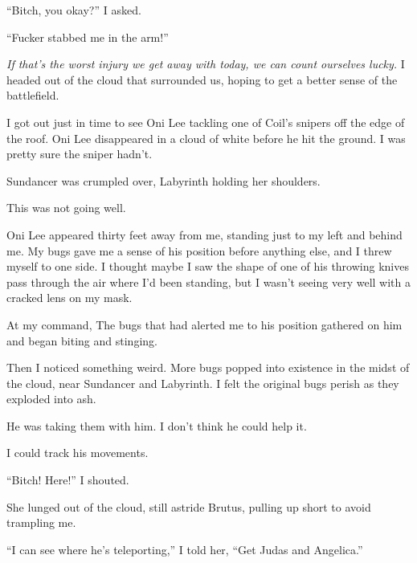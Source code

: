 ``Bitch, you okay?'' I asked.



``Fucker stabbed me in the arm!''



\emph{If that's the worst injury we get away with today, we can count ourselves lucky.}  I headed out of the cloud that surrounded us, hoping to get a better sense of the battlefield.



I got out just in time to see Oni Lee tackling one of Coil's snipers off the edge of the roof.  Oni Lee disappeared in a cloud of white before he hit the ground.  I was pretty sure the sniper hadn't.



Sundancer was crumpled over, Labyrinth holding her shoulders.



This was not going well.



Oni Lee appeared thirty feet away from me, standing just to my left and behind me.  My bugs gave me a sense of his position before anything else, and I threw myself to one side.  I thought maybe I saw the shape of one of his throwing knives pass through the air where I'd been standing, but I wasn't seeing very well with a cracked lens on my mask.



At my command, The bugs that had alerted me to his position gathered on him and began biting and stinging.



Then I noticed something weird.  More bugs popped into existence in the midst of the cloud, near Sundancer and Labyrinth.  I felt the original bugs perish as they exploded into ash.



He was taking them with him.  I don't think he could help it.



I could track his movements.



``Bitch!  Here!'' I shouted.



She lunged out of the cloud, still astride Brutus, pulling up short to avoid trampling me.



``I can see where he's teleporting,'' I told her, ``Get Judas and Angelica.''



